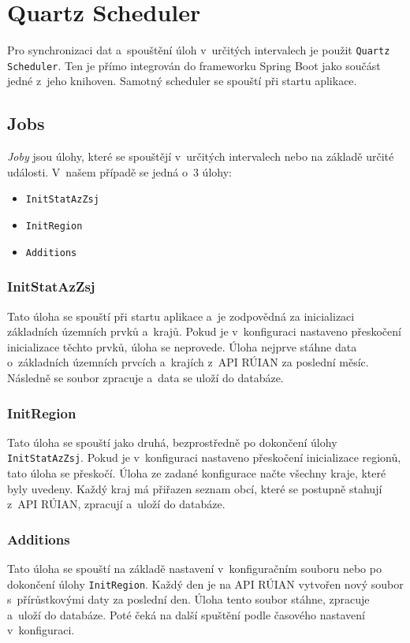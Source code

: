 \section{Quartz Scheduler}
Pro synchronizaci dat a~spouštění úloh v~určitých intervalech je použit \texttt{Quartz Scheduler}.  
Ten je přímo integrován do frameworku Spring Boot jako součást jedné z~jeho knihoven.  
Samotný scheduler se spouští při startu aplikace.

\subsection{Jobs}
\textit{Joby} jsou úlohy, které se spouštějí v~určitých intervalech nebo na základě určité události.  
V~našem případě se jedná o~3 úlohy:
\begin{itemize}
    \item \texttt{InitStatAzZsj}
    \item \texttt{InitRegion}
    \item \texttt{Additions}
\end{itemize}

\subsubsection*{InitStatAzZsj}
Tato úloha se spouští při startu aplikace a~je zodpovědná za inicializaci základních územních prvků a~krajů.  
Pokud je v~konfiguraci nastaveno přeskočení inicializace těchto prvků, úloha se neprovede.  
Úloha nejprve stáhne data o~základních územních prvcích a~krajích z~API RÚIAN za poslední měsíc.  
Následně se soubor zpracuje a~data se uloží do databáze.

\subsubsection*{InitRegion}
Tato úloha se spouští jako druhá, bezprostředně po dokončení úlohy \texttt{InitStatAzZsj}.  
Pokud je v~konfiguraci nastaveno přeskočení inicializace regionů, tato úloha se přeskočí.  
Úloha ze zadané konfigurace načte všechny kraje, které byly uvedeny.  
Každý kraj má přiřazen seznam obcí, které se postupně stahují z~API RÚIAN, zpracují a~uloží do databáze.

\subsubsection*{Additions}
Tato úloha se spouští na základě nastavení v~konfiguračním souboru nebo po dokončení úlohy \texttt{InitRegion}.  
Každý den je na API RÚIAN vytvořen nový soubor s~přírůstkovými daty za poslední den.  
Úloha tento soubor stáhne, zpracuje a~uloží do databáze.  
Poté čeká na další spuštění podle časového nastavení v~konfiguraci.

